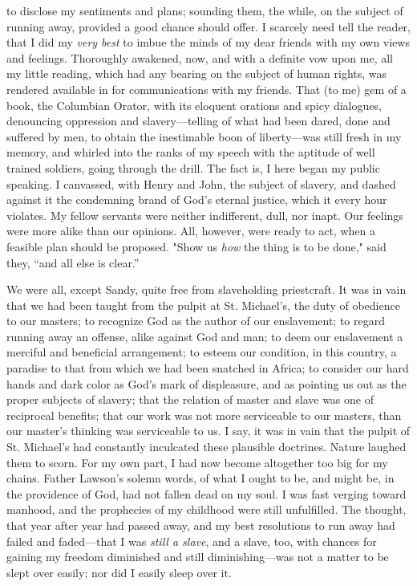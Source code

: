 to disclose my sentiments and plans; sounding them, the while, on the
subject of running away, provided a good chance should offer. I scarcely
need tell the reader, that I did my \emph{very best} to imbue the minds
of my dear friends with my own views and feelings. Thoroughly awakened,
now, and with a definite vow upon me, all my little reading, which had
any bearing on the subject of human rights, was rendered {}available in
for communications with my friends. That (to me) gem of a book, the
Columbian Orator, with its eloquent orations and spicy dialogues,
denouncing oppression and slavery---telling of what had been dared, done
and suffered by men, to obtain the inestimable boon of liberty---was
still fresh in my memory, and whirled into the ranks of my speech with
the aptitude of well trained soldiers, going through the drill. The fact
is, I here began my public speaking. I canvassed, with Henry and John,
the subject of slavery, and dashed against it the condemning brand of
God's eternal justice, which it every hour violates. My fellow servants
were neither indifferent, dull, nor inapt. Our feelings were more alike
than our opinions. All, however, were ready to act, when a feasible plan
should be proposed. "Show us \emph{how} the thing is to be done," said
they, ``and all else is clear.''

We were all, except Sandy, quite free from slaveholding priestcraft. It
was in vain that we had been taught from the pulpit at St. Michael's,
the duty of obedience to our masters; to recognize God as the author of
our enslavement; to regard running away an offense, alike against God
and man; to deem our enslavement a merciful and beneficial arrangement;
to esteem our condition, in this country, a paradise to that from which
we had been snatched in Africa; to consider our hard hands and dark
color as God's mark of displeasure, and as pointing us out as the proper
subjects of slavery; that the relation of master and slave was one of
reciprocal benefits; that our work was not more serviceable to our
masters, than our master's thinking was serviceable to us. I {}say, it
was in vain that the pulpit of St. Michael's had constantly inculcated
these plausible doctrines. Nature laughed them to scorn. For my own
part, I had now become altogether too big for my chains. Father Lawson's
solemn words, of what I ought to be, and might be, in the providence of
God, had not fallen dead on my soul. I was fast verging toward manhood,
and the prophecies of my childhood were still unfulfilled. The thought,
that year after year had passed away, and my best resolutions to run
away had failed and faded---that I was \emph{still a slave}, and a
slave, too, with chances for gaining my freedom diminished and still
diminishing---was not a matter to be slept over easily; nor did I easily
sleep over it.

